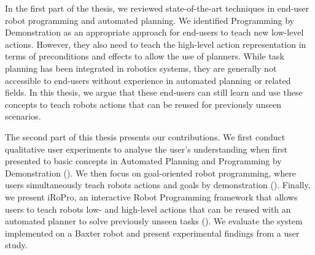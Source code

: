 In the first part of the thesis, we reviewed state-of-the-art techniques in end-user robot programming and automated planning.
We identified Programming by Demonstration as an appropriate approach for end-users to teach new low-level actions.
However, they also need to teach the high-level action representation in terms of preconditions and effects to allow the use of planners.
While task planning has been integrated in robotics systems, they are generally not accessible to end-users without experience in automated planning or related fields.
In this thesis, we argue that these end-users can still learn and use these concepts to teach robots actions that can be reused for previously unseen scenarios.

The second part of this thesis presents our contributions.
We first conduct qualitative user experiments to analyse the user's understanding when first presented to basic concepts in Automated Planning and Programming by Demonstration ().
We then focus on goal-oriented robot programming, where users simultaneously teach robots actions and goals by demonstration ().
Finally, we present iRoPro, an interactive Robot Programming framework that allows users to teach robots low- and high-level actions that can be reused with an automated planner to solve previously unseen tasks ().
We evaluate the system implemented on a Baxter robot and present experimental findings from a user study. %


